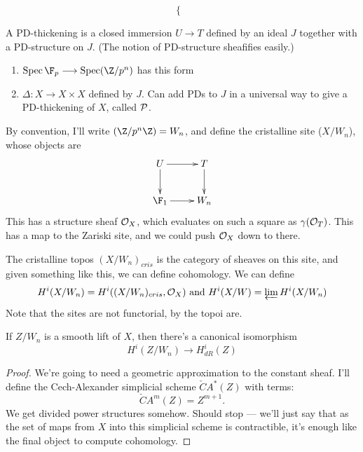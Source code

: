 \begin{SaulCrystallineCohomology}
\begin{exmp*}
\[\begin{cases}
\end{cases}\]
\end{exmp*}
\begin{defn*}
A PD-thickening is a closed immersion $U\to T$ defined by an ideal $J$ together with a PD-structure on $J$. (The notion of PD-structure sheafifies easily.)
\end{defn*}
\begin{exmp*}
\begin{enumerate}\squishlist
\item $\spec\F_p\to\spec(\Z/p^n)$ has this form
\item $\Delta:X\to X\times X$ defined by $J$. Can add PDs to $J$ in a universal way to give a PD-thickening of $X$, called $\mathcal{P}$.
\end{enumerate}

By convention, I'll write $(\Z/p^n\Z)=W_n$, and define the cristalline site ($X/W_n$), whose objects are
\[\xymatrix{
 U\ar[r]\ar[d]&\ar[d] T\\
 \F_1\ar[r]&W_n
}\]
This has a structure sheaf $\mathcal{O}_X$, which evaluates on such a square as $\gamma(\mathcal{O}_T)$. This has a map to the Zariski site, and we could push $\mathcal{O}_X$ down to there.
\end{exmp*}
The cristalline topos $(X/W_n)_{cris}$ is the category of sheaves on this site, and given something like this, we can define cohomology. We can define
\[H^i(X/W_n)=H^i((X/W_n)_{cris},\mathcal{O}_X)\textup{ and }H^i(X/W)=\varprojlim H^i(X/W_n)\]
Note that the sites are not functorial, by the topoi are.
\begin{thm*}[Berthelot]
If $Z/W_n$ is a smooth lift of $X$, then there's a canonical isomorphism
\[H^i(Z/W_n)\to H^i_{dR}(Z)\]
\end{thm*}
\begin{proof}
We're going to need a geometric approximation to the constant sheaf. I'll define the Cech-Alexander simplicial scheme $\check{C}A^*(Z)$ with terms:
\[\check{C}A^m(Z)=Z^{m+1}.\]
We get divided power structures somehow. Should stop --- we'll just say that as the set of maps from $X$ into this simplicial scheme is contractible, it's enough like the final object to compute cohomology.
\end{proof}

\pagebreak
\end{SaulCrystallineCohomology}
